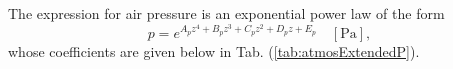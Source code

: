 \documentclass[11pt]{thesis}
\numberwithin{equation}{section}
\begin{document}
The expression for air pressure is an exponential power law of the form
\begin{equation}
p = e^{A_p z^4 + B_p z^3 + C_p z^2 + D_p z + E_p} \quad [\si{\Pa}],
\end{equation}
whose coefficients are given below in Tab. (\ref{tab:atmosExtendedP}).
\end{document}
